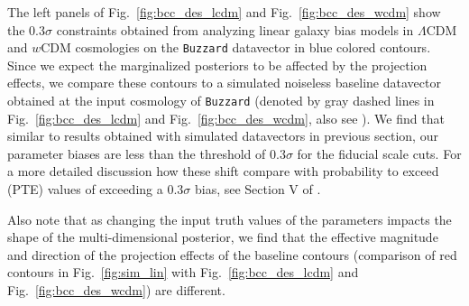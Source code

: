 \documentclass[aps, prd,twocolumn,superscriptaddress,nofootinbib,preprintnumbers]{revtex4-1}
\newcommand{\buzzard}{\texttt{Buzzard} }
\newcommand{\blue}[1]{\textcolor{blue}{#1}}
\begin{document}

The left panels of Fig.~\ref{fig:bcc_des_lcdm} and Fig.~\ref{fig:bcc_des_wcdm} show the 0.3$\sigma$ constraints obtained from analyzing linear galaxy bias models in $\Lambda$CDM and $w$CDM cosmologies on the \buzzard datavector in blue colored contours. Since we expect the marginalized posteriors to be affected by the projection effects, we compare these contours to a simulated noiseless baseline datavector obtained at the input cosmology of \buzzard (denoted by gray dashed lines in Fig.~\ref{fig:bcc_des_lcdm} and Fig.~\ref{fig:bcc_des_wcdm}, also see \citet*{DeRose2019}). We find that similar to results obtained with simulated datavectors in previous section, our parameter biases are less than the threshold of 0.3$\sigma$ for the fiducial scale cuts.  For a more detailed discussion how these shift compare with probability to exceed (PTE) values of exceeding a $0.3\sigma$ bias, see Section V of \citet*{y3-simvalidation}.

Also note that as changing the input truth values of the parameters impacts the shape of the multi-dimensional posterior, we find that the effective magnitude and direction of the projection effects of the baseline contours (comparison of red contours in  Fig.~\ref{fig:sim_lin} with Fig.~\ref{fig:bcc_des_lcdm} and Fig.~\ref{fig:bcc_des_wcdm}) are different. 
\end{document}
